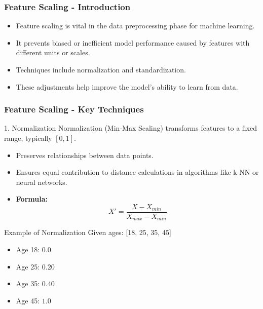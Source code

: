 \documentclass[aspectratio=169]{beamer}
\begin{document}
\begin{frame}[fragile]
    \frametitle{Feature Scaling - Introduction}
    \begin{itemize}
        \item Feature scaling is vital in the data preprocessing phase for machine learning.
        \item It prevents biased or inefficient model performance caused by features with different units or scales.
        \item Techniques include normalization and standardization.
        \item These adjustments help improve the model's ability to learn from data.
    \end{itemize}
\end{frame}

\begin{frame}[fragile]
    \frametitle{Feature Scaling - Key Techniques}
    \begin{block}{1. Normalization}
        Normalization (Min-Max Scaling) transforms features to a fixed range, typically \([0, 1]\).
        \begin{itemize}
            \item Preserves relationships between data points.
            \item Ensures equal contribution to distance calculations in algorithms like k-NN or neural networks.
            \item \textbf{Formula:}
            \[
            X' = \frac{X - X_{min}}{X_{max} - X_{min}}
            \]
        \end{itemize}
    \end{block}
    
    \begin{block}{Example of Normalization}
        Given ages: [18, 25, 35, 45]
        \begin{itemize}
            \item Age 18: \( 0.0 \)
            \item Age 25: \( 0.20 \)
            \item Age 35: \( 0.40 \)
            \item Age 45: \( 1.0 \)
        \end{itemize}
    \end{block}
\end{frame}
\end{document}
